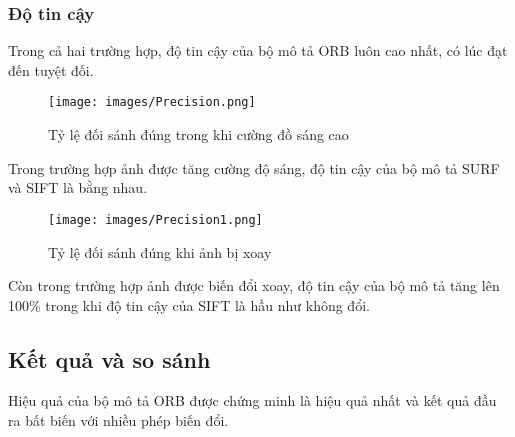\subsubsection{Độ tin cậy}
Trong cả hai trường hợp, độ tin cậy của bộ mô tả ORB luôn cao nhất, có lúc đạt đến tuyệt đối.
\begin{figure}[H]
	\centering
	\texttt{[image: images/Precision.png]}
	\caption{Tỷ lệ đối sánh đúng trong khi cường đồ sáng cao}
\end{figure}
Trong trường hợp ảnh được tăng cường độ sáng, độ tin cậy của bộ mô tả SURF và SIFT là bằng nhau.
\begin{figure}[H]
	\centering
	\texttt{[image: images/Precision1.png]}
	\caption{Tỷ lệ đối sánh đúng khi ảnh bị xoay}
\end{figure}
Còn trong trường hợp ảnh được biến đổi xoay, độ tin cậy của bộ mô tả tăng lên 100\% trong khi độ tin cậy của SIFT là hầu như không đổi.

\subsection{Kết quả và so sánh}
Hiệu quả của bộ mô tả ORB được chứng minh là hiệu quả nhất và kết quả đầu ra bất biến với nhiều phép biến đổi.